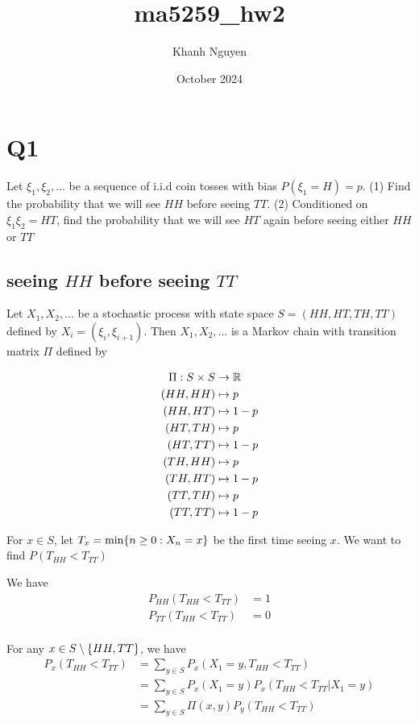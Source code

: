 \documentclass{article}
\title{ma5259\_hw2}
\author{Khanh Nguyen}
\date{October 2024}
\begin{document}
\maketitle

\section{Q1}

Let $\xi_1, \xi_2, ...$ be a sequence of i.i.d coin tosses with bias $P(\xi_1 = H) = p$. (1) Find the probability that we will see $HH$ before seeing $TT$. (2) Conditioned on $\xi_1 \xi_2 = HT$, find the probability that we will see $HT$ again before seeing either $HH$ or $TT$

\subsection{seeing $HH$ before seeing $TT$}

Let $X_1, X_2, ...$ be a stochastic process with state space $S = (HH, HT, TH, TT)$ defined by $X_i = (\xi_i, \xi_{i+1})$. Then $X_1, X_2, ...$ is a Markov chain with transition matrix $\Pi$ defined by

\begin{align*}
    \Pi: S \times S &\to \mathbb{R} \\
    (HH, HH) &\mapsto p \\
    (HH, HT) &\mapsto 1-p \\
    (HT, TH) &\mapsto p \\
    (HT, TT) &\mapsto 1-p \\
    (TH, HH) &\mapsto p \\
    (TH, HT) &\mapsto 1-p \\
    (TT, TH) &\mapsto p \\
    (TT, TT) &\mapsto 1-p \\
\end{align*}


For $x \in S$, let $T_x = \min \{n \geq 0: X_n = x\}$ be the first time seeing $x$. We want to find $P(T_{HH} < T_{TT})$

We have
\begin{align*}
    P_{HH}(T_{HH} < T_{TT}) &= 1 \\
    P_{TT}(T_{HH} < T_{TT}) &= 0 \\
\end{align*}

For any $x \in S \setminus \{HH, TT\}$, we have 
\begin{align*}
    P_x(T_{HH} < T_{TT})
    &= \sum_{y \in S} P_x(X_1 = y, T_{HH} < T_{TT}) \\
    &= \sum_{y \in S} P_x(X_1 = y) P_x(T_{HH} < T_{TT} | X_1 = y) \\
    &= \sum_{y \in S} \Pi(x, y) P_y(T_{HH} < T_{TT}) \\
\end{align*}
\end{document}
